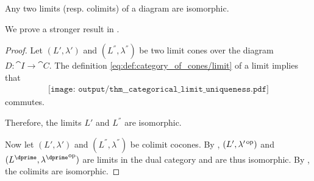 \begin{lemma}\label{thm:categorical_limit_uniqueness_lemma}
  Any two limits (resp. colimits) of a diagram are isomorphic.

  We prove a stronger result in .
\end{lemma}
\begin{proof}
  Let \( (L', \lambda') \) and \( (L^\dprime, \lambda^\dprime) \) be two limit cones over the diagram \( D: \cat{I} \to \cat{C} \). The definition \eqref{eq:def:category_of_cones/limit} of a limit implies that
  \begin{equation}\label{eq:thm:categorical_limit_uniqueness}
    \begin{aligned}
      \texttt{[image: output/thm\_\_categorical\_limit\_uniqueness.pdf]}
    \end{aligned}
  \end{equation}
  commutes.

  Therefore, the limits \( L' \) and \( L^\dprime \) are isomorphic.

  Now let \( (L', \lambda') \) and \( (L^\dprime, \lambda^\dprime) \) be colimit cocones. By , \( (L', \lambda'^{\operatorname{op}}) \) and \( (L^\dprime, {\lambda^\dprime}^{\opcat}) \) are limits in the dual category and are thus isomorphic. By , the colimits are isomorphic.
\end{proof}

